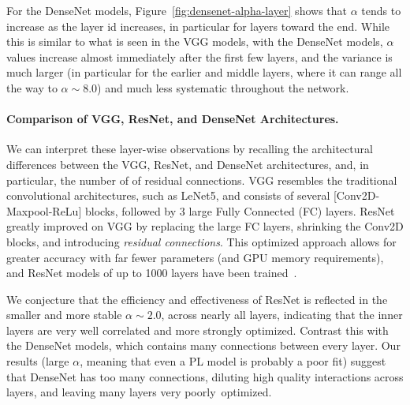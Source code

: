 For the DenseNet models, Figure~\ref{fig:densenet-alpha-layer} shows that $\alpha$ tends to increase as the layer id increases, in particular for layers toward the end.
While this is similar to what is seen in the VGG models, with the DenseNet models, $\alpha$ values increase almost immediately after the first few layers, and the variance is much larger (in particular for the earlier and middle layers, where it can range all the way to $\alpha\sim 8.0$) and much less systematic throughout the network.



\vspace{-1mm}
\paragraph{Comparison of VGG, ResNet, and DenseNet Architectures.}
We can interpret these layer-wise observations by recalling the architectural differences between the VGG, ResNet, and DenseNet architectures,
and, in particular, the number of of residual connections. VGG resembles the  traditional convolutional architectures,
such as LeNet5, and consists of several [Conv2D-Maxpool-ReLu] blocks, followed by 3 large Fully Connected (FC) layers.
ResNet greatly improved on VGG by replacing the large FC layers, shrinking the Conv2D blocks, and introducing \emph{residual connections}.
This optimized approach allows for greater accuracy with far fewer parameters (and GPU memory requirements), and
ResNet models of up to 1000 layers have been trained~\cite{resnet1000}.

We conjecture that the efficiency and effectiveness of ResNet is reflected in the smaller and more stable $\alpha\sim 2.0$, across nearly all layers, indicating that the inner layers are very well correlated and more strongly optimized.
Contrast this with the DenseNet models, which contains many connections between every layer.
Our results (large $\alpha$, meaning that even a PL model is probably a poor fit) suggest that DenseNet has too many connections, diluting high quality interactions across layers, and leaving many layers very poorly~optimized.

